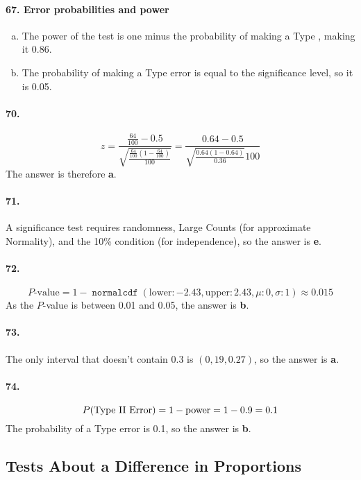 \documentclass[12pt, A4]{article}
\DeclareMathOperator{\normalcdf}{\texttt{normalcdf}}
\newcommand{\normalCDF}[4]{\normalcdf\left(\mathrm{lower}: #1, \mathrm{upper}: #2, \mu: #3, \sigma: #4\right)}
\newcommand{\propse}[2]{\sqrt{\frac{#1\left(1 - #1\right)}{#2}}}
\newcommand{\z}[3]{\frac{#1 - #2}{#3}}
\renewcommand{\Roman}[1]{\MakeUppercase{\romannumeral #1}}
\begin{document}
			\paragraph{67. Error probabilities and power}
				\begin{enumerate}[a.]
					\item 
						The power of the test is one minus the probability of making a Type \Roman{2}, making it 0.86.
					\item 
						The probability of making a Type \Roman{1} error is equal to the significance level, so it is 0.05.
				\end{enumerate}
			\paragraph{70.}
				$$z = \z{\frac{64}{100}}{0.5}{\propse{\frac{64}{100}}{100}} = \z{0.64}{0.5}{\propse{0.64}{0.36}{100}}$$
				The answer is therefore \textbf{a}.
			\paragraph{71.}
				A significance test requires randomness, Large Counts (for approximate Normality), and the 10\% condition (for independence), so the answer is \textbf{e}.
			\paragraph{72.}
				$$P\text{-value} = 1 - \normalCDF{-2.43}{2.43}{0}{1} \approx 0.015$$
				As the $P$-value is between 0.01 and 0.05, the answer is \textbf{b}.
			\paragraph{73.}
				The only interval that doesn't contain 0.3 is $(0,19, 0.27)$, so the answer is \textbf{a}.
			\paragraph{74.}
				$$P(\text{Type \Roman{2} Error}) = 1 - \mathrm{power} = 1 - 0.9 = 0.1$$
				The probability of a Type \Roman{2} error is 0.1, so the answer is \textbf{b}.
		\subsection{Tests About a Difference in Proportions}
\end{document}
